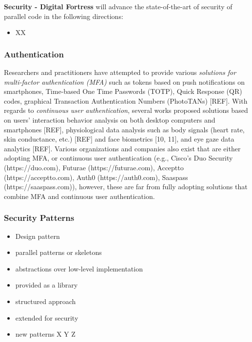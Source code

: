 \documentclass[a4paper,11pt]{article}
\newcommand{\project}[1]{\textbf{#1}\xspace}
\newcommand{\SECURITY}{\project{Security - Digital Fortress}}
\newcommand{\TheProject}{\SECURITY}
\begin{document}
\TheProject{} will advance the state-of-the-art of security of parallel code in the following directions:
\begin{itemize}
\item XX
\end{itemize}

\subsubsection{Authentication}
\label{sect:auth}

Researchers and practitioners have attempted to provide various \textit{solutions for multi-factor authentication (MFA)} such as tokens based on push notifications on smartphones, Time-based One Time Passwords (TOTP), Quick Response (QR) codes, graphical Transaction Authentication Numbers (PhotoTANs) [REF]. With regards to \textit{continuous user authentication}, several works proposed solutions based on users’ interaction behavior analysis on both desktop computers and smartphones [REF], physiological data analysis such as body signals (heart rate, skin conductance, etc.) [REF] and face biometrics [10, 11], and eye gaze data analytics [REF]. Various organizations and companies also exist that are either adopting MFA, or continuous user authentication (e.g., Cisco’s Duo Security (https://duo.com), Futurae (https://futurae.com), Acceptto (https://acceptto.com), Auth0 (https://auth0.com), Saaspass (https://saaspass.com)), however, these are far from fully adopting solutions that combine MFA and continuous user authentication. 

\subsubsection{Security Patterns}
\begin{itemize}
	\item Design pattern
	\item parallel patterns or skeletons
	\item abstractions over low-level implementation
	\item provided as a library
	\item structured approach
	\item extended for security
	\item new patterns X Y Z
\end{itemize}
\end{document}
